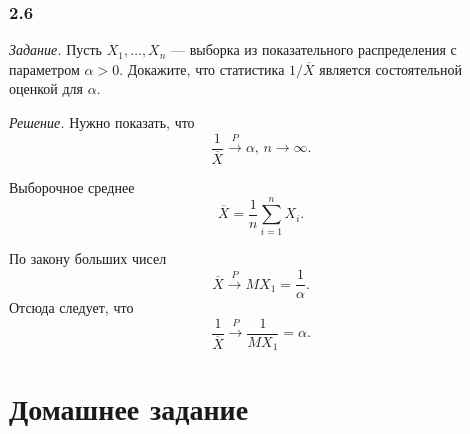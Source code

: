 \subsubsection*{2.6}

\textit{Задание.}
Пусть $X_1, \dotsc, X_n$ --- выборка из показательного распределения с параметром $ \alpha > 0$.
Докажите, что статистика $1 / \overline{X}$ является состоятельной оценкой для $ \alpha $.

\textit{Решение.} Нужно показать, что
$$ \frac{1}{ \overline{X}} \overset{P}{ \rightarrow } \alpha, \,
   n \to \infty.$$

Выборочное среднее
$$ \overline{X} =
  \frac{1}{n} \sum \limits_{i = 1}^n X_i.$$

По закону больших чисел
$$ \overline{X} \overset{P}{ \rightarrow }
  MX_1 =
  \frac{1}{ \alpha }.$$
Отсюда следует, что
$$ \frac{1}{ \overline{X}} \overset{P}{ \rightarrow }
  \frac{1}{MX_1} =
  \alpha.$$

\section*{Домашнее задание}
